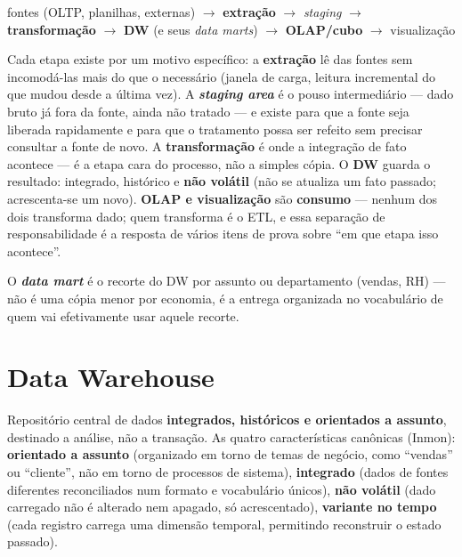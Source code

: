 \begin{conceito}
\begin{center}
fontes (OLTP, planilhas, externas) $\to$ \textbf{extração} $\to$
\textit{staging} $\to$ \textbf{transformação} $\to$ \textbf{DW} (e seus
\textit{data marts}) $\to$ \textbf{OLAP/cubo} $\to$ visualização
\end{center}

Cada etapa existe por um motivo específico: a \textbf{extração} lê das
fontes sem incomodá-las mais do que o necessário (janela de carga, leitura
incremental do que mudou desde a última vez). A \textbf{\textit{staging
area}} é o pouso intermediário --- dado bruto já fora da fonte, ainda não
tratado --- e existe para que a fonte seja liberada rapidamente e para que
o tratamento possa ser refeito sem precisar consultar a fonte de novo. A
\textbf{transformação} é onde a integração de fato acontece --- é a etapa
cara do processo, não a simples cópia. O \textbf{DW} guarda o resultado:
integrado, histórico e \textbf{não volátil} (não se atualiza um fato
passado; acrescenta-se um novo). \textbf{OLAP e visualização} são
\textbf{consumo} --- nenhum dos dois transforma dado; quem transforma é o
ETL, e essa separação de responsabilidade é a resposta de vários itens de
prova sobre “em que etapa isso acontece”.

O \textbf{\textit{data mart}} é o recorte do DW por assunto ou
departamento (vendas, RH) --- não é uma cópia menor por economia, é a
entrega organizada no vocabulário de quem vai efetivamente usar aquele
recorte.
\end{conceito}

\section{Data Warehouse}

\begin{conceito}
Repositório central de dados \textbf{integrados, históricos e orientados a
assunto}, destinado a análise, não a transação. As quatro características
canônicas (Inmon): \textbf{orientado a assunto} (organizado em torno de
temas de negócio, como “vendas” ou “cliente”, não em torno de processos de
sistema), \textbf{integrado} (dados de fontes diferentes reconciliados num
formato e vocabulário únicos), \textbf{não volátil} (dado carregado não é
alterado nem apagado, só acrescentado), \textbf{variante no tempo} (cada
registro carrega uma dimensão temporal, permitindo reconstruir o estado
passado).
\end{conceito}

